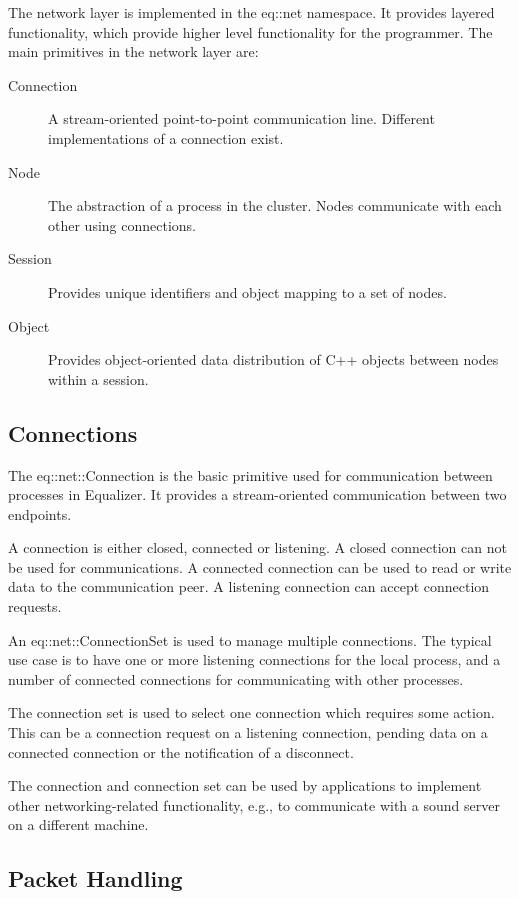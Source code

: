 \documentclass[10pt,a4]{scrartcl}
\begin{document}
The network layer is implemented in the \textsf{eq::net} namespace. It
provides layered functionality, which provide higher level functionality
for the programmer. The main primitives in the network layer are:

\begin{description}
\item[Connection] A stream-oriented point-to-point communication
  line. Different implementations of a connection exist.
\item[Node] The abstraction of a process in the cluster. Nodes
  communicate with each other using connections.
\item[Session] Provides unique identifiers and object mapping to a set
  of nodes.
\item[Object] Provides object-oriented data distribution of C++ objects
  between nodes within a session.
\end{description}

\subsection{Connections}

The \textsf{eq::net::Connection} is the basic primitive used for
communication between processes in Equalizer. It provides a
stream-oriented communication between two endpoints.

A connection is either closed, connected or listening. A closed
connection can not be used for communications. A connected connection
can be used to read or write data to the communication peer. A listening
connection can accept connection requests.

An \textsf{eq::net::ConnectionSet} is used to manage multiple
connections. The typical use case is to have one or more listening
connections for the local process, and a number of connected connections
for communicating with other processes.

The connection set is used to select one connection which requires some
action. This can be a connection request on a listening connection,
pending data on a connected connection or the notification of a
disconnect.

The connection and connection set can be used by applications to
implement other networking-related functionality, e.g., to communicate
with a sound server on a different machine.


\subsection{Packet Handling}
\end{document}
